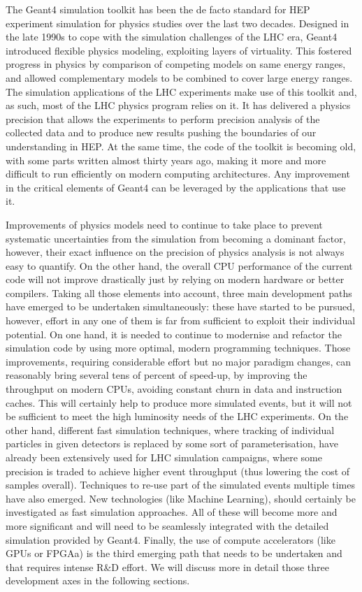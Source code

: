 \documentclass[11pt,a4paper]{article}
\begin{document}
The Geant4 simulation toolkit has been the de facto standard for HEP
experiment simulation for physics studies over the last two decades.
Designed in the late 1990s to cope with the simulation challenges of the
LHC era, Geant4 introduced flexible physics modeling, exploiting layers
of virtuality. This fostered progress in physics by comparison of
competing models on same energy ranges, and allowed complementary models
to be combined to cover large energy ranges. The simulation applications
of the LHC experiments make use of this toolkit and, as such, most of
the LHC physics program relies on it. It has delivered a physics
precision that allows the experiments to perform precision analysis of
the collected data and to produce new results pushing the boundaries of
our understanding in HEP. At the same time, the code of the toolkit is
becoming old, with some parts written almost thirty years ago, making it
more and more difficult to run efficiently on modern computing
architectures. Any improvement in the critical elements of Geant4 can be
leveraged by the applications that use it.

Improvements of physics models need to continue to take place to prevent
systematic uncertainties from the simulation from becoming a dominant
factor, however, their exact influence on the precision of physics
analysis is not always easy to quantify. On the other hand, the overall
CPU performance of the current code will not improve drastically just by
relying on modern hardware or better compilers. Taking all those
elements into account, three main development paths have emerged to be
undertaken simultaneously: these have started to be pursued, however,
effort in any one of them is far from sufficient to exploit their
individual potential. On one hand, it is needed to continue to modernise
and refactor the simulation code by using more optimal, modern
programming techniques. Those improvements, requiring considerable
effort but no major paradigm changes, can reasonably bring several tens
of percent of speed-up, by improving the throughput on modern CPUs,
avoiding constant churn in data and instruction caches. This will
certainly help to produce more simulated events, but it will not be
sufficient to meet the high luminosity needs of the LHC experiments. On
the other hand, different fast simulation techniques, where tracking of
individual particles in given detectors is replaced by some sort of
parameterisation, have already been extensively used for LHC simulation
campaigns, where some precision is traded to achieve higher event
throughput (thus lowering the cost of samples overall). Techniques to
re-use part of the simulated events multiple times have also emerged.
New technologies (like Machine Learning), should certainly be
investigated as fast simulation approaches. All of these will become
more and more significant and will need to be seamlessly integrated with
the detailed simulation provided by Geant4. Finally, the use of compute
accelerators (like GPUs or FPGAa) is the third emerging path that needs
to be undertaken and that requires intense R\&D effort. We will discuss
more in detail those three development axes in the following sections.
\end{document}
